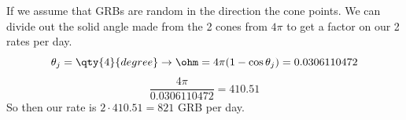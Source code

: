 If we assume that GRBs are random in the direction the cone points. We can divide out the solid angle made from the 2 cones from $4\pi$ to get a factor on our 2 rates per day.
\begin{equation}
    \theta_j = \qty{4}{degree} \rightarrow \ohm = 4\pi(1-\cos\theta_j) = 0.0306110472
\end{equation}
\begin{equation}
    \frac{4\pi}{0.0306110472} = 410.51
\end{equation}
So then our rate is $2\cdot410.51 = 821$ GRB per day.